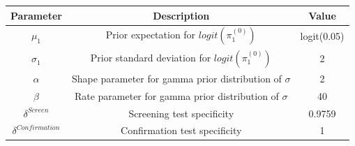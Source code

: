 
\begin{tabular}{ |c|c|c| } 
 \hline
Parameter & Description & Value \\
 \hline\hline
 $\mu_1$ & Prior expectation for $logit(\pi_1^{(0)})$ & logit(0.05)  \\ 
  \hline
 $\sigma_1$ & Prior standard deviation for $logit(\pi_1^{(0)})$ & 2 \\ 
  \hline
 $\alpha$ & Shape parameter for gamma prior distribution of $\sigma$  & 2 \\
  \hline
 $\beta$ & Rate parameter for gamma prior distribution of $\sigma$  & 40 \\
  \hline
$\delta^{Screen}$ & Screening test specificity & 0.9759 \\
 \hline
$\delta^{Confirmation}$ & Confirmation test specificity & 1 \\
 \hline
\end{tabular}

